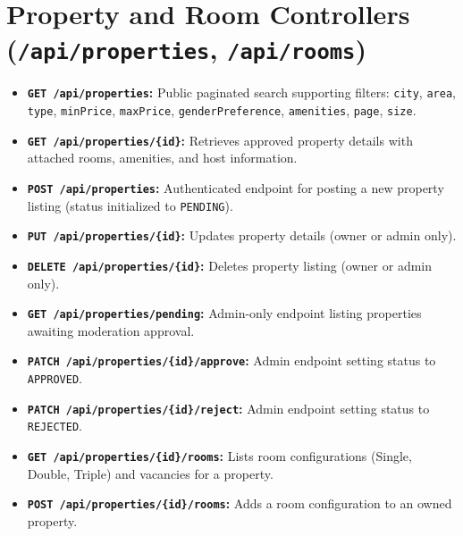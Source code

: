 \section{Property and Room Controllers (\texttt{/api/properties}, \texttt{/api/rooms})}
\begin{itemize}
    \item \textbf{\texttt{GET /api/properties}:} Public paginated search supporting filters: \texttt{city}, \texttt{area}, \texttt{type}, \texttt{minPrice}, \texttt{maxPrice}, \texttt{genderPreference}, \texttt{amenities}, \texttt{page}, \texttt{size}.
    \item \textbf{\texttt{GET /api/properties/\{id\}}:} Retrieves approved property details with attached rooms, amenities, and host information.
    \item \textbf{\texttt{POST /api/properties}:} Authenticated endpoint for posting a new property listing (status initialized to \texttt{PENDING}).
    \item \textbf{\texttt{PUT /api/properties/\{id\}}:} Updates property details (owner or admin only).
    \item \textbf{\texttt{DELETE /api/properties/\{id\}}:} Deletes property listing (owner or admin only).
    \item \textbf{\texttt{GET /api/properties/pending}:} Admin-only endpoint listing properties awaiting moderation approval.
    \item \textbf{\texttt{PATCH /api/properties/\{id\}/approve}:} Admin endpoint setting status to \texttt{APPROVED}.
    \item \textbf{\texttt{PATCH /api/properties/\{id\}/reject}:} Admin endpoint setting status to \texttt{REJECTED}.
    \item \textbf{\texttt{GET /api/properties/\{id\}/rooms}:} Lists room configurations (Single, Double, Triple) and vacancies for a property.
    \item \textbf{\texttt{POST /api/properties/\{id\}/rooms}:} Adds a room configuration to an owned property.
\end{itemize}

